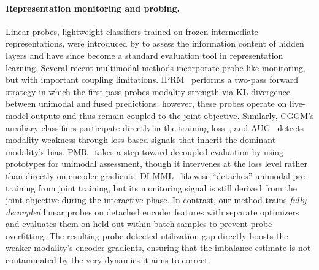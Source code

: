 \documentclass{article}
\begin{document}
\paragraph{Representation monitoring and probing.}

Linear probes, lightweight classifiers trained on frozen intermediate representations, were introduced by \citet{alain2017understanding} to assess the information content of hidden layers and have since become a standard evaluation tool in representation learning. Several recent multimodal methods incorporate probe-like monitoring, but with important coupling limitations. IPRM~\citep{yang2025iprm} performs a two-pass forward strategy in which the first pass probes modality strength via KL divergence between unimodal and fused predictions; however, these probes operate on live-model outputs and thus remain coupled to the joint objective. Similarly, CGGM's auxiliary classifiers participate directly in the training loss~\citep{guo2024cggm}, and AUG~\citep{jiang2025aug} detects modality weakness through loss-based signals that inherit the dominant modality's bias. PMR~\citep{fan2023pmr} takes a step toward decoupled evaluation by using prototypes for unimodal assessment, though it intervenes at the loss level rather than directly on encoder gradients. DI-MML~\citep{fan2024dimml} likewise ``detaches'' unimodal pre-training from joint training, but its monitoring signal is still derived from the joint objective during the interactive phase. In contrast, our method trains \emph{fully decoupled} linear probes on detached encoder features with separate optimizers and evaluates them on held-out within-batch samples to prevent probe overfitting. The resulting probe-detected utilization gap directly boosts the weaker modality's encoder gradients, ensuring that the imbalance estimate is not contaminated by the very dynamics it aims to correct.
\end{document}
